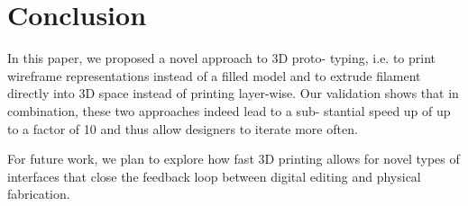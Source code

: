 \section{Conclusion}
In this paper, we proposed a novel approach to 3D proto- typing, i.e. to print wireframe representations instead of a filled model and to extrude filament directly into 3D space instead of printing layer-wise. Our validation shows that in combination, these two approaches indeed lead to a sub- stantial speed up of up to a factor of 10 and thus allow designers to iterate more often.

For future work, we plan to explore how fast 3D printing allows for novel types of interfaces that close the feedback loop between digital editing and physical fabrication.